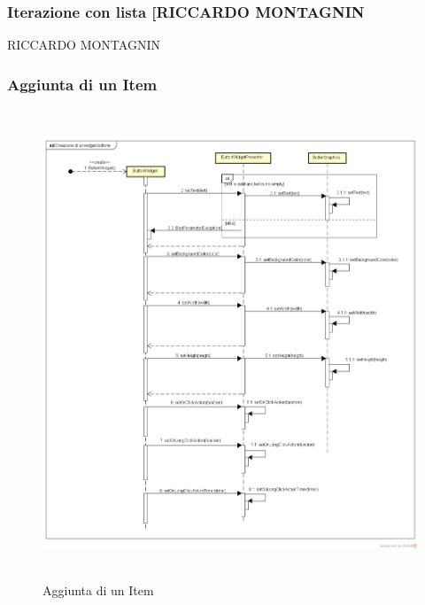 \subsubsection{Iterazione con lista [RICCARDO MONTAGNIN}

RICCARDO MONTAGNIN


\subsubsection{Aggiunta di un Item}

\label{Aggiunta di un Item}
\begin{figure}[H]
	\centering
	\includegraphics[width=16cm, height=14cm]{Sezioni/Diagrammi/img/Creazione di un widget bottone.png}
	\caption{Aggiunta di un Item}
\end{figure}

